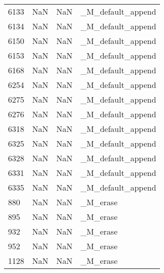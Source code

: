 \begin{tabular}{llll}
6133 &                   NaN &                        NaN &                         \_M\_default\_append \\
6134 &                   NaN &                        NaN &                         \_M\_default\_append \\
6150 &                   NaN &                        NaN &                         \_M\_default\_append \\
6153 &                   NaN &                        NaN &                         \_M\_default\_append \\
6168 &                   NaN &                        NaN &                         \_M\_default\_append \\
6254 &                   NaN &                        NaN &                         \_M\_default\_append \\
6275 &                   NaN &                        NaN &                         \_M\_default\_append \\
6276 &                   NaN &                        NaN &                         \_M\_default\_append \\
6318 &                   NaN &                        NaN &                         \_M\_default\_append \\
6325 &                   NaN &                        NaN &                         \_M\_default\_append \\
6328 &                   NaN &                        NaN &                         \_M\_default\_append \\
6331 &                   NaN &                        NaN &                         \_M\_default\_append \\
6335 &                   NaN &                        NaN &                         \_M\_default\_append \\
880  &                   NaN &                        NaN &                                  \_M\_erase \\
895  &                   NaN &                        NaN &                                  \_M\_erase \\
932  &                   NaN &                        NaN &                                  \_M\_erase \\
952  &                   NaN &                        NaN &                                  \_M\_erase \\
1128 &                   NaN &                        NaN &                                  \_M\_erase \\

\end{tabular}
